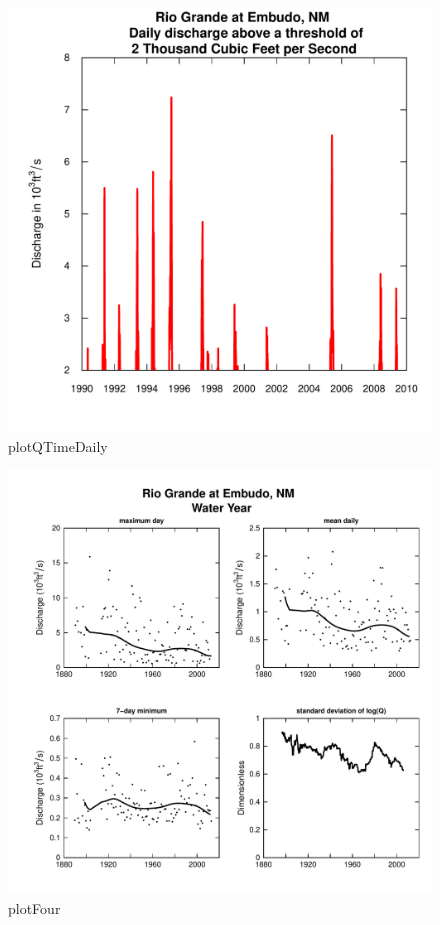 \documentclass[a4paper,11pt]{article}\usepackage{graphicx, color}
\newenvironment{knitrout}{}{} %
\begin{document}
\begin{knitrout}
\color{fgcolor}\begin{figure}[]

\includegraphics[width=.5\linewidth,height=.5\linewidth]{figure/plotQTimeDaily} \caption[plotQTimeDaily]{plotQTimeDaily\label{fig:plotQTimeDaily}}
\end{figure}


\end{knitrout}


\begin{knitrout}
\color{fgcolor}\begin{figure}[]

\includegraphics[width=1\linewidth,height=1\linewidth]{figure/plotFour} \caption[plotFour]{plotFour\label{fig:plotFour}}
\end{figure}


\end{knitrout}
\end{document}
